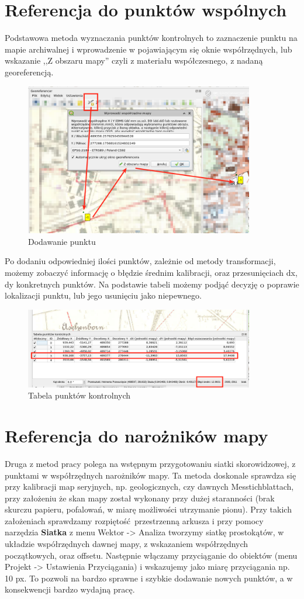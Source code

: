 \documentclass[a4paper,11pt, onecolumn, openany]{memoir}
\begin{document}
		\section{Referencja do punktów wspólnych}
		Podstawowa metoda wyznaczania punktów kontrolnych to zaznaczenie punktu na mapie archiwalnej i wprowadzenie w pojawiającym się oknie współrzędnych, lub wskazanie ,,Z obszaru mapy'' czyli z materiału współczesnego, z nadaną georeferencją.
		\begin{figure}[!ht]
			\centering
			\includegraphics[width=10cm]{georef-dodaj}
			\caption{Dodawanie punktu}
		\end{figure}
		Po dodaniu odpowiedniej ilości punktów, zależnie od metody transformacji, możemy zobaczyć informację o błędzie średnim kalibracji, oraz przesunięciach dx, dy konkretnych punktów. Na podstawie tabeli możemy podjąć decyzję o poprawie lokalizacji punktu, lub jego usunięciu jako niepewnego.
		\begin{figure}[!ht]
		\centering
		\includegraphics[width=10cm]{georef-tabela-punktow}
		\caption{Tabela punktów kontrolnych}
	\end{figure}

		\section{Referencja do narożników mapy}
		Druga z metod pracy polega na wstępnym przygotowaniu siatki skorowidzowej, z punktami w współrzędnych narożników mapy. Ta metoda doskonale sprawdza się przy kalibracji map seryjnych, np. geologicznych, czy dawnych Messtichblattach, przy założeniu że skan mapy został wykonany przy dużej staranności (brak skurczu papieru, pofalowań, w miarę możliwości utrzymanie pionu).
		Przy takich założeniach sprawdzamy rozpiętość przestrzenną arkusza i przy pomocy narzędzia \textbf{Siatka} z menu Wektor -> Analiza tworzymy siatkę prostokątów, w układzie współrzędnych dawnej mapy, z wskazaniem współrzędnych początkowych, oraz offsetu.
		Następnie włączamy przyciąganie do obiektów (menu Projekt -> Ustawienia Przyciągania) i wskazujemy jako miarę przyciągania np. 10 px. To pozwoli na bardzo sprawne i szybkie dodawanie nowych punktów, a w konsekwencji bardzo wydajną pracę.
		\pagebreak
\end{document}
